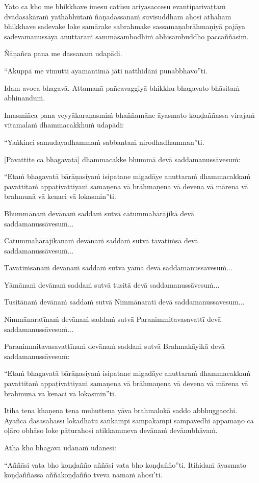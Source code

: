 Yato ca kho me bhikkhave imesu catūsu ariyasaccesu evantiparivaṭṭaṁ dvādasākāraṁ yathābhūtaṁ ñāṇadassanaṁ suvisuddham ahosi athāham bhikkhave sadevake loke samārake sabrahmake sassamaṇabrāhmaṇiyā pajāya sadevamanussāya anuttaraṁ sammāsambodhiṁ abhisambuddho paccaññāsiṁ.

Ñāṇañca pana me dassanaṁ udapādi.

``Akuppā me vimutti ayamantimā jāti natthidāni punabbhavo''ti.

Idam avoca bhagavā. Attamanā pañcavaggiyā bhikkhu bhagavato bhāsitaṁ abhinanduṁ.

Imasmiñca pana veyyākaraṇasmiṁ bhaññamāne āyasmato koṇḍaññassa virajaṁ vītamalaṁ dhammacakkhuṁ udapādi:

``Yaṅkinci samudayadhammaṁ sabbantaṁ nirodhadhamman''ti.

[Pavattite ca bhagavatā] dhammacakke bhummā devā saddamanussāvesuṁ:

``Etaṁ bhagavatā bārāṇasiyaṁ isipatane migadāye anuttaraṁ dhammacakkaṁ pavattitaṁ appaṭivattiyaṁ samaṇena vā brāhmaṇena vā devena vā mārena vā brahmunā vā kenaci vā lokasmin''ti.

Bhummānaṁ devānaṁ saddaṁ sutvā cātummahārājikā devā saddamanussāvesuṁ...

Cātummahārājikanaṁ devānaṁ saddaṁ sutvā tāvatiṁsā devā saddamanussāvesuṁ...

Tāvatiṁsānaṁ devānaṁ saddaṁ sutvā yāmā devā saddamanussāvesuṁ...

Yāmānaṁ devānaṁ saddaṁ sutvā tusitā devā saddamanussāvesuṁ...

Tusitānaṁ devānaṁ saddaṁ sutvā Nimmānaratī devā saddamanussavesum...

Nimmānaratīnaṁ devānaṁ saddaṁ sutvā Paranimmitavasavattī devā saddamanussāvesuṁ...

Paranimmitavasavattīnaṁ devānaṁ saddaṁ sutvā Brahmakāyikā devā saddamanussāvesuṁ:

``Etaṁ bhagavatā bārāṇasiyaṁ isipatane migadāye anuttaraṁ dhammacakkaṁ pavattitaṁ appaṭivattiyaṁ samaṇena vā brāhmaṇena vā devena vā mārena vā brahmunā vā kenaci vā lokasmin''ti.

Itiha tena khaṇena tena muhuttena yāva brahmalokā saddo abbhuggacchi. Ayañca dasasahassī lokadhātu saṅkampi sampakampi sampavedhi appamāṇo ca oḷāro obhāso loke pāturahosi atikkammeva devānaṁ devānubhāvaṁ.

Atha kho bhagavā udānaṁ udānesi:

``Aññāsi vata bho koṇḍañño aññāsi vata bho koṇḍañño''ti. Itihidaṁ āyasmato koṇḍaññassa aññākoṇḍañño tveva nāmaṁ ahosī’ti.

\suttaRef{[SN 56.11]}

